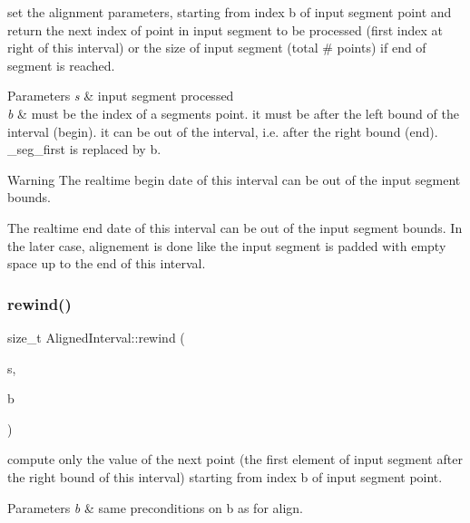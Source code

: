 set the alignment parameters, starting from index b of input segment point and return the next index of point in input segment to be processed (first index at right of this interval) or the size of input segment (total \# points) if end of segment is reached. 


\begin{DoxyParams}{Parameters}
{\em s} & input segment processed \\
\hline
{\em b} & must be the index of a segment\textquotesingle{}s point. it must be after the left bound of the interval (begin). it can be out of the interval, i.\+e. after the right bound (end). \+\_\+seg\+\_\+first is replaced by b.\\
\hline
\end{DoxyParams}
\begin{DoxyWarning}{Warning}
The realtime begin date of this interval can be out of the input segment bounds. 

The realtime end date of this interval can be out of the input segment bounds. In the later case, alignement is done like the input segment is padded with empty space up to the end of this interval. 
\end{DoxyWarning}
\mbox{\label{group__segment_gafad6a7eea9e5892cfae9986f6263a738}} 
\subsubsection{\texorpdfstring{rewind()}{rewind()}}
{\footnotesize\ttfamily size\+\_\+t Aligned\+Interval\+::rewind (\begin{DoxyParamCaption}\item[{const \mbox{\hyperlink{classInputSegment}{Input\+Segment}} $\ast$}]{s,  }\item[{size\+\_\+t}]{b }\end{DoxyParamCaption})}



compute only the value of the next point (the first element of input segment after the right bound of this interval) starting from index b of input segment point. 


\begin{DoxyParams}{Parameters}
{\em b} & same preconditions on b as for align. \\
\hline
\end{DoxyParams}
\mbox{\label{group__segment_ga35cbd86caf5c17f8d59559ae0b28febf}} 

